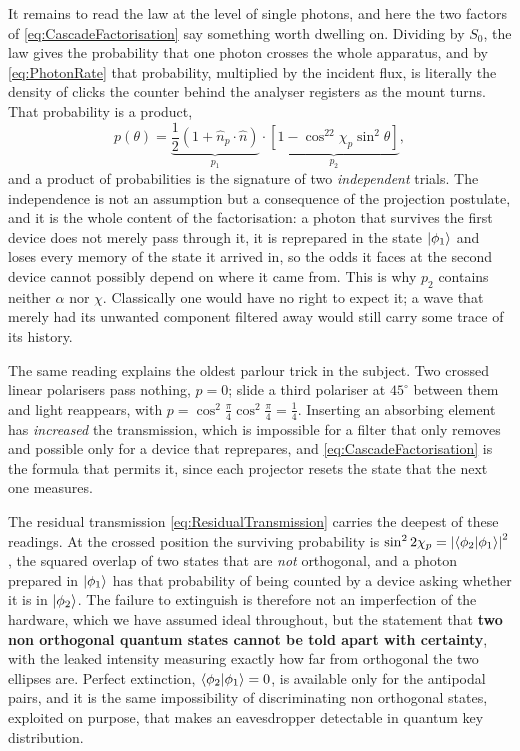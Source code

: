             It remains to read the law at the level of single photons, and here the two factors of \ref{eq:CascadeFactorisation} say something worth dwelling on. Dividing by $S_0$, the law gives the probability that one photon crosses the whole apparatus, and by \ref{eq:PhotonRate} that probability, multiplied by the incident flux, is literally the density of clicks the counter behind the analyser registers as the mount turns. That probability is a product,
            \begin{equation}\label{eq:PhotonProduct}
                p(\theta) = \underbrace{\frac{1}{2}\left(1+\hat{n}_p\cdot\hat{n}\right)}_{p_1}\cdot\underbrace{\left[1-\cos^22\chi_p\sin^2\theta\right]}_{p_2} ,
            \end{equation}
            and a product of probabilities is the signature of two \textit{independent} trials. The independence is not an assumption but a consequence of the projection postulate, and it is the whole content of the factorisation: a photon that survives the first device does not merely pass through it, it is reprepared in the state $\ket{\phi_1}$ and loses every memory of the state it arrived in, so the odds it faces at the second device cannot possibly depend on where it came from. This is why $p_2$ contains neither $\alpha$ nor $\chi$. Classically one would have no right to expect it; a wave that merely had its unwanted component filtered away would still carry some trace of its history.

            The same reading explains the oldest parlour trick in the subject. Two crossed linear polarisers pass nothing, $p=0$; slide a third polariser at $45^{\circ}$ between them and light reappears, with $p=\cos^2\frac{\pi}{4}\cos^2\frac{\pi}{4}=\frac{1}{4}$. Inserting an absorbing element has \textit{increased} the transmission, which is impossible for a filter that only removes and possible only for a device that reprepares, and \ref{eq:CascadeFactorisation} is the formula that permits it, since each projector resets the state that the next one measures.

            The residual transmission \ref{eq:ResidualTransmission} carries the deepest of these readings. At the crossed position the surviving probability is $\sin^22\chi_p=\left|\braket{\phi_2|\phi_1}\right|^2$, the squared overlap of two states that are \textit{not} orthogonal, and a photon prepared in $\ket{\phi_1}$ has that probability of being counted by a device asking whether it is in $\ket{\phi_2}$. The failure to extinguish is therefore not an imperfection of the hardware, which we have assumed ideal throughout, but the statement that \textbf{two non orthogonal quantum states cannot be told apart with certainty}, with the leaked intensity measuring exactly how far from orthogonal the two ellipses are. Perfect extinction, $\braket{\phi_2|\phi_1}=0$, is available only for the antipodal pairs, and it is the same impossibility of discriminating non orthogonal states, exploited on purpose, that makes an eavesdropper detectable in quantum key distribution.

